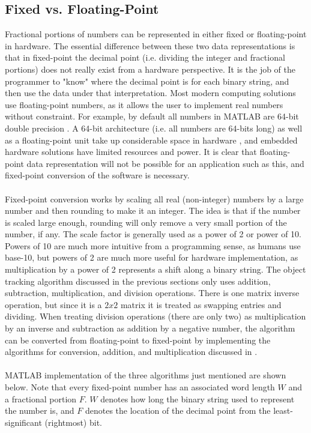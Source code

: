 \documentclass[12pt]{article} %
\begin{document}
\subsection{Fixed vs. Floating-Point}
\label{sec:fp}
Fractional portions of numbers can be represented in either fixed or floating-point in hardware. The essential difference between these two data representations is that in fixed-point the decimal point (i.e. dividing the integer and fractional portions) does not really exist from a hardware perspective. It is the job of the programmer to "know" where the decimal point is for each binary string, and then use the data under that interpretation. Most modern computing solutions use floating-point numbers, as it allows the user to implement real numbers without constraint. For example, by default all numbers in MATLAB are 64-bit double precision \cite{10}. A 64-bit architecture (i.e. all numbers are 64-bits long) as well as a floating-point unit take up considerable space in hardware \cite{10}, and embedded hardware solutions have limited resources and power. It is clear that floating-point data representation will not be possible for an application such as this, and fixed-point conversion of the software is necessary. \\\\
Fixed-point conversion works by scaling all real (non-integer) numbers by a large number and then rounding to make it an integer. The idea is that if the number is scaled large enough, rounding will only remove a very small portion of the number, if any. The scale factor is generally used as a power of 2 or power of 10. Powers of 10 are much more intuitive from a programming sense, as humans use base-10, but powers of 2 are much more useful for hardware implementation, as multiplication by a power of 2 represents a shift along a binary string. The object tracking algorithm discussed in the previous sections only uses addition, subtraction, multiplication, and division operations. There is one matrix inverse operation, but since it is a $2x2$ matrix it is treated as swapping entries and dividing. When treating division operations (there are only two) as multiplication by an inverse and subtraction as addition by a negative number, the algorithm can be converted from floating-point to fixed-point by implementing the algorithms for conversion, addition, and multiplication discussed in \cite{10}. \\\\
MATLAB implementation of the three algorithms just mentioned are shown below. Note that every fixed-point number has an associated word length $W$ and a fractional portion $F$. $W$ denotes how long the binary string used to represent the number is, and $F$ denotes the location of the decimal point from the least-significant (rightmost) bit. \\\\
\end{document}
